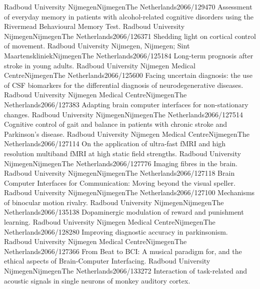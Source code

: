	{Radboud University Nijmegen}{Nijmegen}{The Netherlands}{2066/129470}
	{Assessment of everyday memory in patients with alcohol-related cognitive disorders using the Rivermead Behavioural Memory Test.}
	{Radboud University Nijmegen}{Nijmegen}{The Netherlands}{2066/126371}
	{Shedding light on cortical control of movement.}
	{Radboud University Nijmegen, Nijmegen; Sint Maartenskliniek}{Nijmegen}{The Netherlands}{2066/125184}
	{Long-term prognosis after stroke in young adults.}
	{Radboud University Nijmegen Medical Centre}{Nijmegen}{The Netherlands}{2066/125600}
	{ Facing uncertain diagnosis: the use of CSF biomarkers for the differential diagnosis of neurodegenerative diseases.}
	{Radboud University Nijmegen Medical Centre}{Nijmegen}{The Netherlands}{2066/127383}
	{Adapting brain computer interfaces for non-stationary changes.}
	{Radboud University Nijmegen}{Nijmegen}{The Netherlands}{2066/127514}
	{ Cognitive control of gait and balance in patients with chronic stroke and Parkinson's disease.}
	{Radboud University Nijmegen Medical Centre}{Nijmegen}{The Netherlands}{2066/127114}
	{On the application of ultra-fast fMRI and high resolution multiband fMRI at high static field strengths.}
	{Radboud University Nijmegen}{Nijmegen}{The Netherlands}{2066/127776}
	{Imaging fibres in the brain.}
	{Radboud University Nijmegen}{Nijmegen}{The Netherlands}{2066/127118}
	{Brain Computer Interfaces for Communication: Moving beyond the visual speller.}
	{Radboud University Nijmegen}{Nijmegen}{The Netherlands}{2066/127100}
	{Mechanisms of binocular motion rivalry.}
	{Radboud University Nijmegen}{Nijmegen}{The Netherlands}{2066/135138}
	{Dopaminergic modulation of reward and punishment learning.}
	{Radboud University Nijmegen Medical Centre}{Nijmegen}{The Netherlands}{2066/128280}
	{Improving diagnostic accuracy in parkinsonism.}
	{Radboud University Nijmegen Medical Centre}{Nijmegen}{The Netherlands}{2066/127366}
	{From Beat to BCI: A musical paradigm for, and the ethical aspects of Brain-Computer Interfacing.}
	{Radboud University Nijmegen}{Nijmegen}{The Netherlands}{2066/133272}
	{Interaction of task-related and acoustic signals in single neurons of monkey auditory cortex.}
